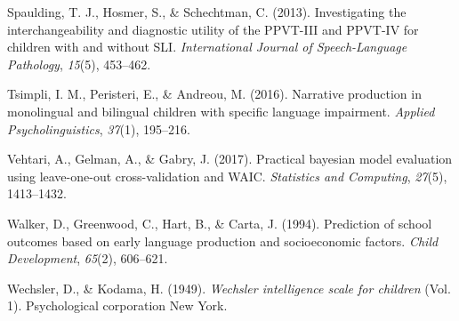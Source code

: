 \documentclass[
  man,floatsintext]{apa6}
\newlength{\cslhangindent}
\newlength{\cslentryspacingunit} %
\newenvironment{CSLReferences}[2] %
 {%
  \setlength{\parindent}{0pt}
  \ifodd #1
  \let\oldpar\par
  \def\par{\hangindent=\cslhangindent\oldpar}
  \fi
  \setlength{\parskip}{#2\cslentryspacingunit}
 }%
 {}
\begin{document}
\begin{CSLReferences}{1}{0}
\leavevmode{}%
Spaulding, T. J., Hosmer, S., \& Schechtman, C. (2013). Investigating the interchangeability and diagnostic utility of the PPVT-III and PPVT-IV for children with and without SLI. \emph{International Journal of Speech-Language Pathology}, \emph{15}(5), 453--462.

\leavevmode{}%
Tsimpli, I. M., Peristeri, E., \& Andreou, M. (2016). Narrative production in monolingual and bilingual children with specific language impairment. \emph{Applied Psycholinguistics}, \emph{37}(1), 195--216.

\leavevmode{}%
Vehtari, A., Gelman, A., \& Gabry, J. (2017). Practical bayesian model evaluation using leave-one-out cross-validation and WAIC. \emph{Statistics and Computing}, \emph{27}(5), 1413--1432.

\leavevmode{}%
Walker, D., Greenwood, C., Hart, B., \& Carta, J. (1994). Prediction of school outcomes based on early language production and socioeconomic factors. \emph{Child Development}, \emph{65}(2), 606--621.

\leavevmode{}%
Wechsler, D., \& Kodama, H. (1949). \emph{Wechsler intelligence scale for children} (Vol. 1). Psychological corporation New York.

\end{CSLReferences}
\end{document}
